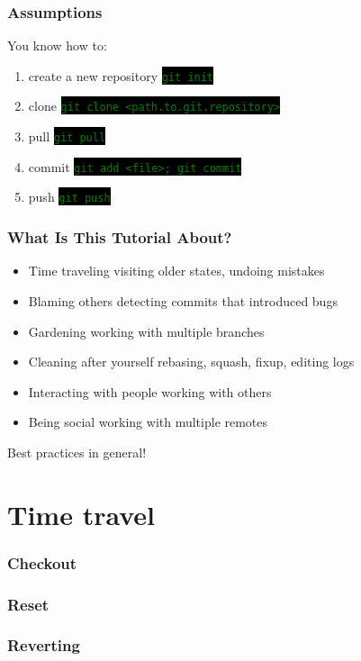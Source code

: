 \documentclass[
14pt,
aspectratio=169,
usenames,
dvipsnames,
x11names]{beamer}
\newcommand{\code}[1]{\colorbox{black}{\textcolor{green}{\texttt{#1}}}}
\newcommand{\buz}[2]{#1 \hfill \textcolor{Gray!50}{#2}}
\begin{document}
\begin{frame}
  \frametitle{Assumptions}
  \alert{You} know how to:
  \begin{enumerate}
  \item create a new repository \hfill \code{git init}
  \item clone \hfill \code{git clone <path.to.git.repository>}
  \item pull \hfill \code{git pull}
  \item commit \hfill \code{git add <file>; git commit}
  \item push \hfill \code{git push}
  \end{enumerate}
\end{frame}

\begin{frame}
  \frametitle{What Is This Tutorial About?}
  \begin{itemize} \setlength{\itemsep}{\fill}
  \item \buz{Time traveling}{visiting older states, undoing mistakes}
  \item \buz{Blaming others}{detecting commits that introduced bugs}
  \item \buz{Gardening}{working with multiple branches}
  \item \buz{Cleaning after yourself}{rebasing, squash, fixup, editing logs}
  \item \buz{Interacting with people}{working with others}
  \item \buz{Being social}{working with multiple remotes}
  \end{itemize}
  \centering
  \alert{Best practices} in general!
\end{frame}

\section{Time travel}

\begin{frame}
  \frametitle{Checkout}

\end{frame}

\begin{frame}
  \frametitle{Reset}

\end{frame}

\begin{frame}
  \frametitle{Reverting}

\end{frame}
\end{document}
